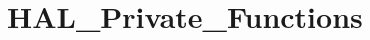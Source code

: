 \hypertarget{group___h_a_l___private___functions}{}\section{H\+A\+L\+\_\+\+Private\+\_\+\+Functions}
\label{group___h_a_l___private___functions}
